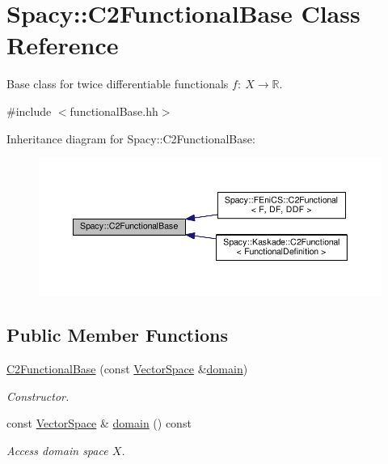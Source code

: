 \hypertarget{classSpacy_1_1C2FunctionalBase}{}\section{Spacy\+:\+:C2\+Functional\+Base Class Reference}
\label{classSpacy_1_1C2FunctionalBase}


Base class for twice differentiable functionals $ f:\ X\rightarrow \mathbb{R}$.  




{\ttfamily \#include $<$functional\+Base.\+hh$>$}



Inheritance diagram for Spacy\+:\+:C2\+Functional\+Base\+:\nopagebreak
\begin{figure}[H]
\begin{center}
\leavevmode
\includegraphics[width=350pt]{classSpacy_1_1C2FunctionalBase__inherit__graph}
\end{center}
\end{figure}
\subsection*{Public Member Functions}
\begin{DoxyCompactItemize}
\item 
\hyperlink{classSpacy_1_1C2FunctionalBase_a38ed7514896d9e7b576d22c12b6d153e_a38ed7514896d9e7b576d22c12b6d153e}{C2\+Functional\+Base} (const \hyperlink{classSpacy_1_1VectorSpace}{Vector\+Space} \&\hyperlink{classSpacy_1_1C2FunctionalBase_a016d11deb1525e762bdfbe7e54250718_a016d11deb1525e762bdfbe7e54250718}{domain})
\begin{DoxyCompactList}\small\item\em Constructor. \end{DoxyCompactList}\item 
const \hyperlink{classSpacy_1_1VectorSpace}{Vector\+Space} \& \hyperlink{classSpacy_1_1C2FunctionalBase_a016d11deb1525e762bdfbe7e54250718_a016d11deb1525e762bdfbe7e54250718}{domain} () const 
\begin{DoxyCompactList}\small\item\em Access domain space $X$. \end{DoxyCompactList}\end{DoxyCompactItemize}


